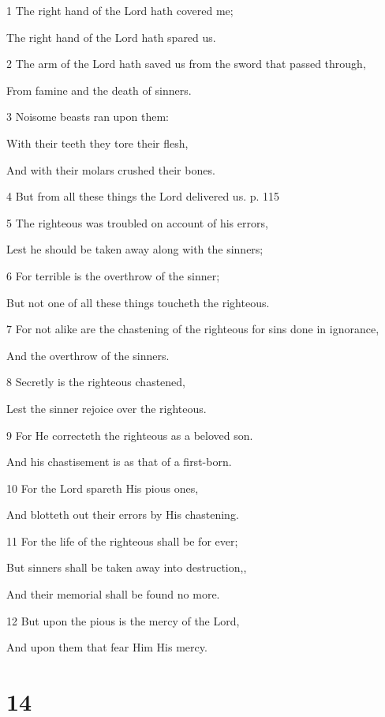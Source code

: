 \par 1 The right hand of the Lord hath covered me;
\par  The right hand of the Lord hath spared us.
\par 2 The arm of the Lord hath saved us from the sword that passed through,
\par  From famine and the death of sinners.
\par 3 Noisome beasts ran upon them:
\par  With their teeth they tore their flesh,
\par  And with their molars crushed their bones.
\par 4 But from all these things the Lord delivered us. p. 115
\par 5 The righteous was troubled on account of his errors,
\par  Lest he should be taken away along with the sinners;
\par 6 For terrible is the overthrow of the sinner;
\par  But not one of all these things toucheth the righteous.
\par 7 For not alike are the chastening of the righteous for sins done in ignorance,
\par  And the overthrow of the sinners.
\par 8 Secretly is the righteous chastened,
\par  Lest the sinner rejoice over the righteous.
\par 9 For He correcteth the righteous as a beloved son.
\par  And his chastisement is as that of a first-born.
\par 10 For the Lord spareth His pious ones,
\par  And blotteth out their errors by His chastening.
\par 11 For the life of the righteous shall be for ever;
\par  But sinners shall be taken away into destruction,,
\par  And their memorial shall be found no more.
\par 12 But upon the pious is the mercy of the Lord,
\par  And upon them that fear Him His mercy.



\chapter{14}

